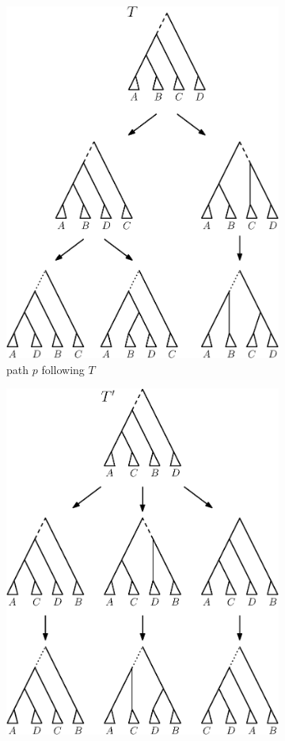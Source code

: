 \documentclass{amsart}
\begin{document}
\begin{enumerate}[label = 1.{\arabic*}]
\begin{figure}[H]
	\begin{subfigure}[b]{.45\textwidth}
		\centering
		\includegraphics[width=0.9\linewidth]{thm_fp_nni2a.eps}
		\vspace{12pt}
		\caption{path $p$ following $T$}
		\label{fig:thm_fp_nni2a}
	\end{subfigure}
	\begin{subfigure}[b]{.45\textwidth}
		\centering
		\includegraphics[width=0.9\linewidth]{thm_fp_nni2b.eps}

\end{subfigure}
\end{figure}
\end{enumerate}
\end{document}
